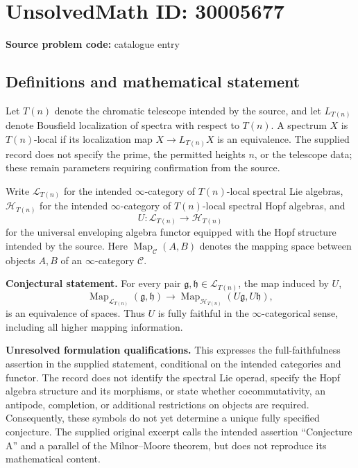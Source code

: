 \documentclass[11pt]{article}
\begin{document}
\section*{UnsolvedMath ID: 30005677}
\textbf{Source problem code:} catalogue entry
\subsection{Definitions and mathematical statement}
Let \(T(n)\) denote the chromatic telescope intended by the source, and let \(L_{T(n)}\) denote Bousfield localization of spectra with respect to \(T(n)\). A spectrum \(X\) is \(T(n)\)-local if its localization map \(X\to L_{T(n)}X\) is an equivalence. The supplied record does not specify the prime, the permitted heights \(n\), or the telescope data; these remain parameters requiring confirmation from the source.

Write \(\mathcal L_{T(n)}\) for the intended \(\infty\)-category of \(T(n)\)-local spectral Lie algebras, \(\mathcal H_{T(n)}\) for the intended \(\infty\)-category of \(T(n)\)-local spectral Hopf algebras, and
\[
U\colon \mathcal L_{T(n)}\longrightarrow \mathcal H_{T(n)}
\]
for the universal enveloping algebra functor equipped with the Hopf structure intended by the source. Here \(\operatorname{Map}_{\mathcal C}(A,B)\) denotes the mapping space between objects \(A,B\) of an \(\infty\)-category \(\mathcal C\).

\textbf{Conjectural statement.} For every pair \(\mathfrak g,\mathfrak h\in\mathcal L_{T(n)}\), the map induced by \(U\),
\[
\operatorname{Map}_{\mathcal L_{T(n)}}(\mathfrak g,\mathfrak h)
\longrightarrow
\operatorname{Map}_{\mathcal H_{T(n)}}(U\mathfrak g,U\mathfrak h),
\]
is an equivalence of spaces. Thus \(U\) is fully faithful in the \(\infty\)-categorical sense, including all higher mapping information.

\textbf{Unresolved formulation qualifications.} This expresses the full-faithfulness assertion in the supplied statement, conditional on the intended categories and functor. The record does not identify the spectral Lie operad, specify the Hopf algebra structure and its morphisms, or state whether cocommutativity, an antipode, completion, or additional restrictions on objects are required. Consequently, these symbols do not yet determine a unique fully specified conjecture. The supplied original excerpt calls the intended assertion ``Conjecture A'' and a parallel of the Milnor--Moore theorem, but does not reproduce its mathematical content.
\end{document}
